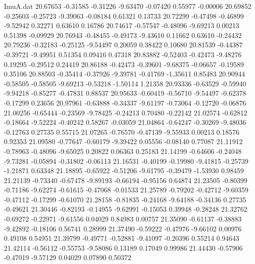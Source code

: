 \begin{filecontents}{ImuA.dat}
  20.67653   -0.31585   -0.31226   -9.63470   -0.07420    0.55977   -0.00006
  20.69852   -0.25603   -0.25723   -9.39063   -0.08184    0.61321    0.13733
  20.72299   -0.47498   -0.46899   -9.52942    0.32271    0.63610    0.16786
  20.74617   -0.57547   -0.48096   -9.69213    0.00213    0.51398   -0.09929
  20.76943   -0.48455   -0.49173   -9.43610    0.11662    0.63610   -0.24432
  20.79236   -0.32183   -0.25125   -9.54497    0.20059    0.38422    0.10680
  20.81539   -0.44387   -0.39721   -9.49951    0.51354    0.09416    0.47318
  20.83882   -0.52403   -0.42473   -9.48276    0.19295   -0.29512    0.24419
  20.86188   -0.42473   -0.39601   -9.68375   -0.06657   -0.19589    0.35106
  20.88503   -0.35414   -0.37926   -9.39781   -0.41769   -1.35611    0.85483
  20.90944   -0.58505   -0.58505   -9.69213   -0.53218   -1.50114    1.21358
  20.93336   -0.63529   -0.59940   -9.94218   -0.85277   -0.47831    0.88537
  20.95633   -0.60419   -0.56710   -9.54497   -0.62378   -0.17299    0.23656
  20.97961   -0.63888   -0.34337   -9.61197   -0.73064   -0.12720   -0.06876
  21.00256   -0.65444   -0.23569   -9.78425   -0.24213    0.70480   -0.22142
  21.02574   -0.62812   -0.18664   -9.52224   -0.40242    0.58267   -0.03059
  21.04864   -0.64247   -0.30269   -9.48036   -0.12763    0.27735    0.55715
  21.07265   -0.76570   -0.47139   -9.55933    0.00213    0.18576    0.92353
  21.09580   -0.77647   -0.60179   -9.39422    0.05556   -0.08140    0.77087
  21.11912   -0.78963   -0.48096   -9.65025    0.20822    0.06363    0.25183
  21.14199   -0.64606   -0.24048   -9.73281   -0.05894   -0.31802   -0.06113
  21.16531   -0.40199   -0.19980   -9.41815   -0.25739   -1.21871    0.63348
  21.18895   -0.65922   -0.51206   -9.61795   -0.39479   -1.53930    0.98459
  21.21139   -0.73340   -0.67478   -9.89193   -0.66194   -0.95156    0.64874
  21.23505   -0.80399   -0.71186   -9.62274   -0.61615   -0.47068   -0.01533
  21.25789   -0.79202   -0.42712   -9.60359   -0.47112   -0.17299   -0.61070
  21.28158   -0.81835   -0.24168   -9.64188   -0.34136    0.27735   -0.49621
  21.30446   -0.82193   -0.14955   -9.62991   -0.15053    0.39948   -0.28248
  21.32762   -0.69272   -0.22971   -9.61556    0.04029    0.84983    0.00757
  21.35090   -0.61137   -0.38883   -9.42892   -0.18106    0.56741    0.28999
  21.37490   -0.59222   -0.47976   -9.66102    0.00976    0.49108    0.54951
  21.39799   -0.49771   -0.52881   -9.41097   -0.20396    0.55214    0.94643
  21.42114   -0.56112   -0.55753   -9.58086    0.13189    0.17049    0.99986
  21.44430   -0.57906   -0.47019   -9.57129    0.04029    0.07890    0.50372

\end{filecontents}
